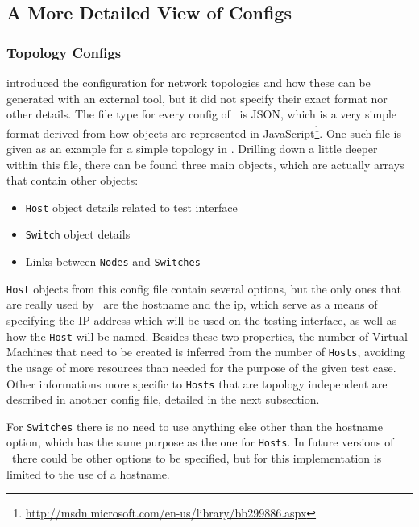 \subsection{A More Detailed View of Configs}
\label{sub-sec:configs-detalied}

\subsubsection{Topology Configs}
\label{sub-sub-sec:topology-configs}

 introduced the configuration for network topologies and how these can be generated with an external tool, but it did not specify their exact format nor other details.
The file type for every config of \project\ is JSON, which is a very simple format derived from how objects are represented in JavaScript\footnote{\url{http://msdn.microsoft.com/en-us/library/bb299886.aspx}}.
One such file is given as an example for a simple topology in .
Drilling down a little deeper within this file, there can be found three main objects, which are actually arrays that contain other objects:

\begin{itemize}
  \item \texttt{Host} object details related to test interface
  \item \texttt{Switch} object details
  \item Links between \texttt{Nodes} and \texttt{Switches}
\end{itemize}

\texttt{Host} objects from this config file contain several options, but the only ones that are really used by \project\ are the hostname and the ip, which serve as a means of specifying the IP address which will be used on the testing interface, as well as how the \texttt{Host} will be named.
Besides these two properties, the number of Virtual Machines that need to be created is inferred from the number of \texttt{Hosts}, avoiding the usage of more resources than needed for the purpose of the given test case.
Other informations more specific to \texttt{Hosts} that are topology independent are described in another config file, detailed in the next subsection.

For \texttt{Switches} there is no need to use anything else other than the hostname option, which has the same purpose as the one for \texttt{Hosts}.
In future versions of \project\ there could be other options to be specified, but for this implementation is limited to the use of a hostname.


